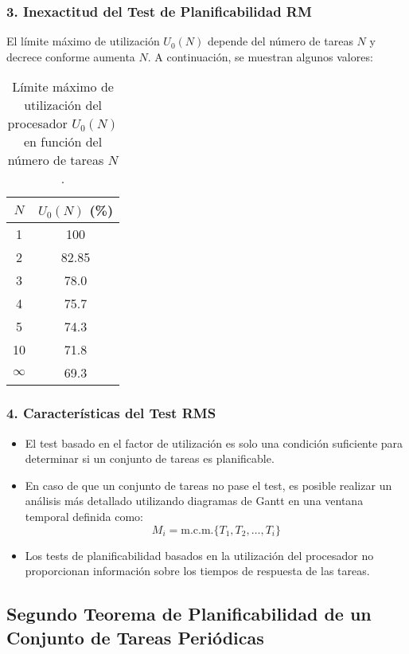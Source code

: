 \documentclass[a4paper,12pt]{article}
\begin{document}
\subsubsection{3. Inexactitud del Test de Planificabilidad RM}

El límite máximo de utilización \(U_0(N)\) depende del número de tareas \(N\) y decrece conforme aumenta \(N\). A continuación, se muestran algunos valores:

\begin{table}[H]
\centering
\begin{tabular}{|c|c|}
\hline
\textbf{\(N\)} & \textbf{\(U_0(N)\) (\%)} \\
\hline
1 & 100 \\
2 & 82.85 \\
3 & 78.0 \\
4 & 75.7 \\
5 & 74.3 \\
10 & 71.8 \\
\(\infty\) & 69.3 \\
\hline
\end{tabular}
\caption{Límite máximo de utilización del procesador \(U_0(N)\) en función del número de tareas \(N\).}
\end{table}

\subsubsection{4. Características del Test RMS}

\begin{itemize}
    \item El test basado en el factor de utilización es solo una condición suficiente para determinar si un conjunto de tareas es planificable.
    \item En caso de que un conjunto de tareas no pase el test, es posible realizar un análisis más detallado utilizando diagramas de Gantt en una ventana temporal definida como:
    \[
    M_i = \text{m.c.m.}\{T_1, T_2, \ldots, T_i\}
    \]
    \item Los tests de planificabilidad basados en la utilización del procesador no proporcionan información sobre los tiempos de respuesta de las tareas.
\end{itemize}

\subsection{Segundo Teorema de Planificabilidad de un Conjunto de Tareas Periódicas}
\end{document}
